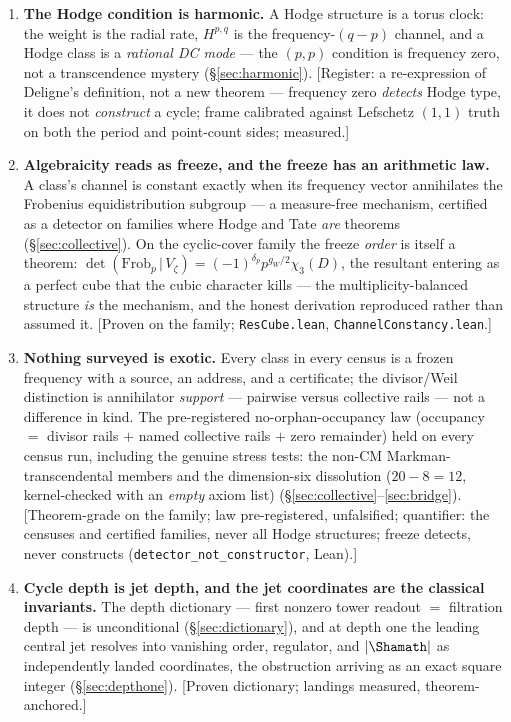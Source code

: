 \documentclass[11pt]{article}
\theoremstyle{definition}
\theoremstyle{remark}
\begin{document}
\begin{enumerate}\setlength\itemsep{0.45\baselineskip}
\item \textbf{The Hodge condition is harmonic.} A Hodge structure is a torus
clock: the weight is the radial rate, $H^{p,q}$ is the frequency-$(q{-}p)$
channel, and a Hodge class is a \emph{rational DC mode} --- the $(p,p)$
condition is frequency zero, not a transcendence mystery
(\S\ref{sec:harmonic}). [Register: a re-expression of Deligne's definition,
not a new theorem --- frequency zero \emph{detects} Hodge type, it does not
\emph{construct} a cycle; frame calibrated against Lefschetz $(1,1)$ truth on
both the period and point-count sides; measured.]

\item \textbf{Algebraicity reads as freeze, and the freeze has an arithmetic
law.} A class's channel is constant exactly when its frequency vector
annihilates the Frobenius equidistribution subgroup --- a measure-free
mechanism, certified as a detector on families where Hodge and Tate \emph{are}
theorems (\S\ref{sec:collective}). On the cyclic-cover family the freeze
\emph{order} is itself a theorem:
$\det(\mathrm{Frob}_p\,|\,V_\zeta)=(-1)^{\delta_p}p^{g_W/2}\chi_3(D)$, the
resultant entering as a perfect cube that the cubic character kills --- the
multiplicity-balanced structure \emph{is} the mechanism, and the honest
derivation reproduced rather than assumed it. [Proven on the family;
\texttt{ResCube.lean}, \texttt{ChannelConstancy.lean}.]

\item \textbf{Nothing surveyed is exotic.} Every class in every census is a frozen
frequency with a source, an address, and a certificate; the divisor/Weil
distinction is annihilator \emph{support} --- pairwise versus collective rails
--- not a difference in kind. The pre-registered no-orphan-occupancy law
(occupancy $=$ divisor rails $+$ named collective rails $+$ zero remainder)
held on every census run, including the genuine stress tests: the non-CM
Markman-transcendental members and the dimension-six dissolution
($20-8=12$, kernel-checked with an \emph{empty} axiom list)
(\S\ref{sec:collective}--\ref{sec:bridge}). [Theorem-grade on the family;
law pre-registered, unfalsified; quantifier: the censuses and certified
families, never all Hodge structures; freeze detects, never constructs
(\texttt{detector\_not\_constructor}, Lean).]

\item \textbf{Cycle depth is jet depth, and the jet coordinates are the
classical invariants.} The depth dictionary --- first nonzero tower readout
$=$ filtration depth --- is unconditional (\S\ref{sec:dictionary}), and at
depth one the leading central jet resolves into vanishing order, regulator,
and $|\Shamath|$ as independently landed coordinates, the obstruction arriving
as an exact square integer (\S\ref{sec:depthone}). [Proven dictionary;
landings measured, theorem-anchored.]


\end{enumerate}
\end{document}
